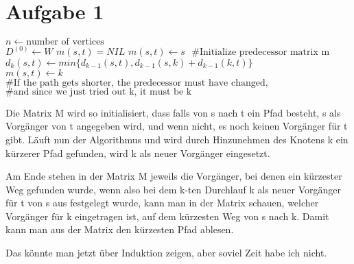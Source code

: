 \documentclass{article}
\begin{document}
\section*{Aufgabe 1}

\begin{algorithm}
\begin{algorithmic}[5]

\State $ n \gets \text{number of vertices}$ \\
\State $D^{(0)} \gets W$ 
\State $m(s,t) = NIL$
\Else  
\State $m(s,t) \gets s$
\State $\text{ \#Initialize predecessor matrix m}$
\EndIf
\EndFor
\EndFor
{}
\State $d_k(s,t) \gets min\{d_{k-1}(s,t), d_{k-1}(s,k) + d_{k-1}(k,t)\}$\\
\State $m(s,t) \gets k$ \\
\State $\text{\# If the path gets shorter, the predecessor must have changed,}$
\State $\text{\# and since we just tried out k, it must be k}$
\EndIf
\EndFor
\EndFor
\EndFor


\EndFunction

\end{algorithmic}
\end{algorithm}

Die Matrix M wird so initialisiert, dass falls von s nach t ein Pfad 
besteht, s als Vorgänger von t angegeben wird, und wenn nicht, es noch 
keinen Vorgänger für t gibt. 
Läuft nun der Algorithmus und wird durch Hinzunehmen des Knotens k ein 
kürzerer Pfad gefunden, wird k als neuer Vorgänger eingesetzt. 

Am Ende stehen in der Matrix M jeweils die Vorgänger, bei denen ein 
kürzester Weg gefunden wurde, wenn also bei dem k-ten Durchlauf k als 
neuer Vorgänger für t von s aus festgelegt wurde, kann man in der 
Matrix schauen, welcher Vorgänger für k eingetragen ist, auf dem 
kürzesten Weg von s nach k. Damit kann man aus der Matrix den kürzesten 
Pfad ablesen. 

Das könnte man jetzt über Induktion zeigen, aber soviel Zeit habe 
ich nicht. 
\end{document}
